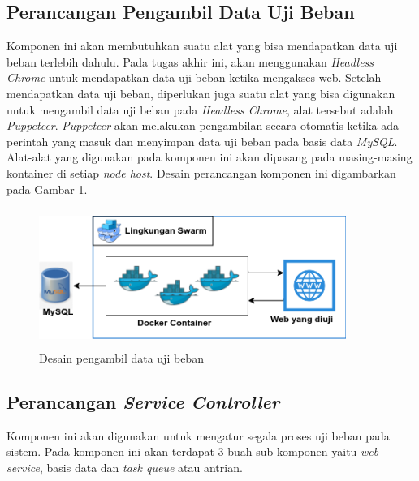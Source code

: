     	\subsection{Perancangan Pengambil Data Uji Beban}
    		Komponen ini akan membutuhkan suatu alat yang bisa mendapatkan data uji beban terlebih dahulu. Pada tugas akhir ini, akan menggunakan \textit{Headless Chrome} untuk mendapatkan data uji beban ketika mengakses web. Setelah mendapatkan data uji beban, diperlukan juga suatu alat yang bisa digunakan untuk mengambil data uji beban pada \textit{Headless Chrome}, alat tersebut adalah \textit{Puppeteer}. \textit{Puppeteer} akan melakukan pengambilan secara otomatis ketika ada perintah yang masuk dan menyimpan data uji beban pada basis data \textit{MySQL}. Alat-alat yang digunakan pada komponen ini akan dipasang pada masing-masing kontainer di setiap \textit{node host}. Desain perancangan komponen ini digambarkan pada Gambar \ref{puppdesain}.
    		\begin{figure}[H]
    			\centering
    			\includegraphics[width=10cm,height=4.5cm]{Images/C-3/puppdesain.png}
    			\caption{Desain pengambil data uji beban}
    			\label{puppdesain}
    		\end{figure}
    	
    	\subsection{Perancangan \textit{Service Controller}}
    		Komponen ini akan digunakan untuk mengatur segala proses uji beban pada sistem. Pada komponen ini akan terdapat 3 buah sub-komponen yaitu \textit{web service}, basis data dan \textit{task queue} atau antrian.
    	
